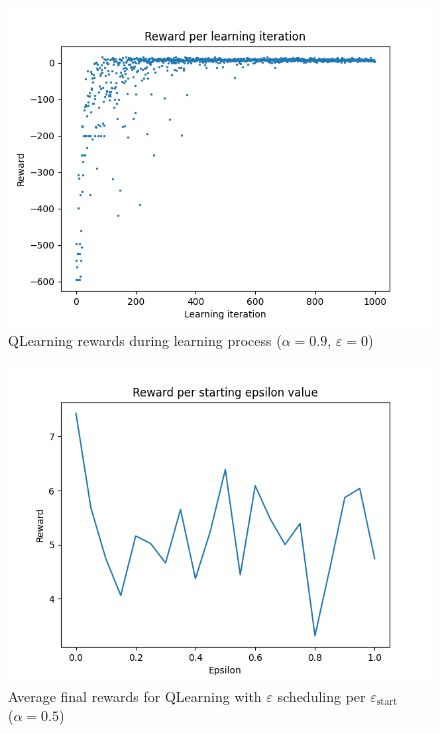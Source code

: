 \documentclass[11pt]{article}
\def\greedyeps{0}
\def\greedyalph{0.9}
\begin{document}
\begin{figure}[H]
	\centering
	\includegraphics[width=12cm]{../figures/part_1/learning_reward_optimized_qlearning.png}
	\caption{QLearning rewards during learning process ($\alpha = \greedyalph$, $\varepsilon = \greedyeps$)}
	\label{fig:qlearning_opti_reward}
\end{figure}

\begin{figure}[H]
	\centering
	\includegraphics[width=12cm]{../figures/part_2/learning_reward_qlearning_eps_schedule_start_eps_search.png}
	\caption{Average final rewards for QLearning with $\varepsilon$ scheduling per $\varepsilon_{\text{start}}$\\($\alpha = 0.5$)}
	\label{fig:qlearning_eps_schedule_eps_search}
\end{figure}
\end{document}
